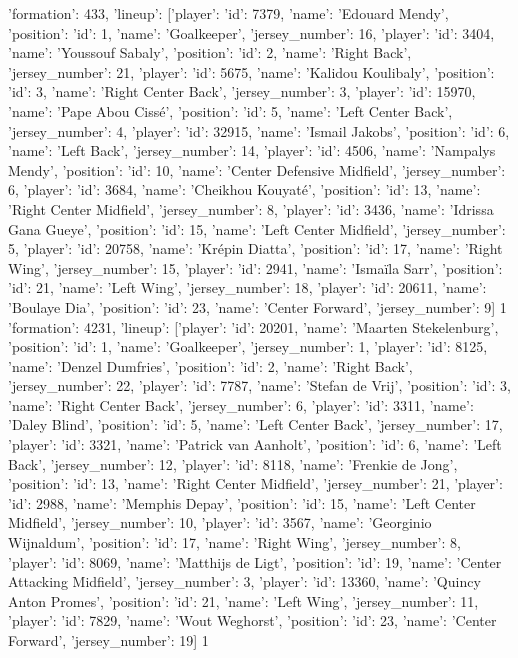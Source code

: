 {'formation': 433, 'lineup': [{'player': {'id': 7379, 'name': 'Edouard Mendy'}, 'position': {'id': 1, 'name': 'Goalkeeper'}, 'jersey_number': 16}, {'player': {'id': 3404, 'name': 'Youssouf Sabaly'}, 'position': {'id': 2, 'name': 'Right Back'}, 'jersey_number': 21}, {'player': {'id': 5675, 'name': 'Kalidou Koulibaly'}, 'position': {'id': 3, 'name': 'Right Center Back'}, 'jersey_number': 3}, {'player': {'id': 15970, 'name': 'Pape Abou Cissé'}, 'position': {'id': 5, 'name': 'Left Center Back'}, 'jersey_number': 4}, {'player': {'id': 32915, 'name': 'Ismail Jakobs'}, 'position': {'id': 6, 'name': 'Left Back'}, 'jersey_number': 14}, {'player': {'id': 4506, 'name': 'Nampalys Mendy'}, 'position': {'id': 10, 'name': 'Center Defensive Midfield'}, 'jersey_number': 6}, {'player': {'id': 3684, 'name': 'Cheikhou Kouyaté'}, 'position': {'id': 13, 'name': 'Right Center Midfield'}, 'jersey_number': 8}, {'player': {'id': 3436, 'name': 'Idrissa Gana Gueye'}, 'position': {'id': 15, 'name': 'Left Center Midfield'}, 'jersey_number': 5}, {'player': {'id': 20758, 'name': 'Krépin Diatta'}, 'position': {'id': 17, 'name': 'Right Wing'}, 'jersey_number': 15}, {'player': {'id': 2941, 'name': 'Ismaïla Sarr'}, 'position': {'id': 21, 'name': 'Left Wing'}, 'jersey_number': 18}, {'player': {'id': 20611, 'name': 'Boulaye Dia'}, 'position': {'id': 23, 'name': 'Center Forward'}, 'jersey_number': 9}]}                                                                               1
{'formation': 4231, 'lineup': [{'player': {'id': 20201, 'name': 'Maarten Stekelenburg'}, 'position': {'id': 1, 'name': 'Goalkeeper'}, 'jersey_number': 1}, {'player': {'id': 8125, 'name': 'Denzel Dumfries'}, 'position': {'id': 2, 'name': 'Right Back'}, 'jersey_number': 22}, {'player': {'id': 7787, 'name': 'Stefan de Vrij'}, 'position': {'id': 3, 'name': 'Right Center Back'}, 'jersey_number': 6}, {'player': {'id': 3311, 'name': 'Daley Blind'}, 'position': {'id': 5, 'name': 'Left Center Back'}, 'jersey_number': 17}, {'player': {'id': 3321, 'name': 'Patrick van Aanholt'}, 'position': {'id': 6, 'name': 'Left Back'}, 'jersey_number': 12}, {'player': {'id': 8118, 'name': 'Frenkie de Jong'}, 'position': {'id': 13, 'name': 'Right Center Midfield'}, 'jersey_number': 21}, {'player': {'id': 2988, 'name': 'Memphis Depay'}, 'position': {'id': 15, 'name': 'Left Center Midfield'}, 'jersey_number': 10}, {'player': {'id': 3567, 'name': 'Georginio Wijnaldum'}, 'position': {'id': 17, 'name': 'Right Wing'}, 'jersey_number': 8}, {'player': {'id': 8069, 'name': 'Matthijs de Ligt'}, 'position': {'id': 19, 'name': 'Center Attacking Midfield'}, 'jersey_number': 3}, {'player': {'id': 13360, 'name': 'Quincy Anton Promes'}, 'position': {'id': 21, 'name': 'Left Wing'}, 'jersey_number': 11}, {'player': {'id': 7829, 'name': 'Wout Weghorst'}, 'position': {'id': 23, 'name': 'Center Forward'}, 'jersey_number': 19}]}                                                             1
